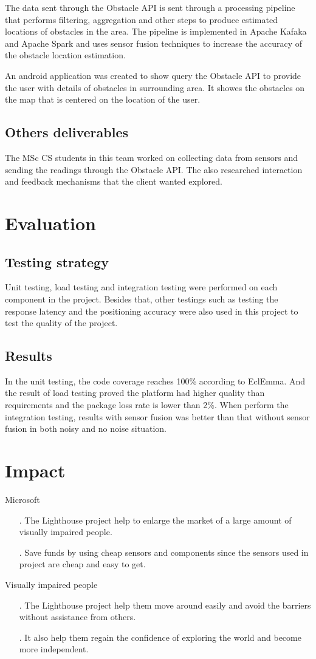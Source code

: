 \documentclass[prodmode,acmtosem]{acmsmall} %
\begin{document}
The data sent through the Obstacle API is sent through a processing pipeline that performs filtering, aggregation and other steps to produce estimated locations of obstacles in the area. The pipeline is implemented in Apache Kafaka and Apache Spark and uses sensor fusion techniques to increase the accuracy of the obstacle location estimation. 

An android application was created to show query the Obstacle API to provide the user with details of obstacles in surrounding area. It showes the obstacles on the map that is centered on the location of the user.

\subsection{Others deliverables}
The MSc CS students in this team worked on collecting data from sensors and sending the readings through the Obstacle API. The also researched interaction and feedback mechanisms that the client wanted explored.

\section{Evaluation}
\subsection{Testing strategy}
Unit testing, load testing and integration testing were performed on each component in the project. Besides that, other testings such as testing the response latency and the positioning accuracy were also used in this project to test the quality of the project.
\subsection{Results}
In the unit testing, the code coverage reaches 100\% according to EclEmma. And the result of load testing proved the platform had higher quality than requirements and the package loss rate is lower than 2\%. When perform the integration testing, results with sensor fusion was better than that without sensor fusion in both noisy and no noise situation.
\section{Impact}
Microsoft
\begin{itemize}
\item[.] The Lighthouse project help to enlarge the market of a large amount of visually impaired people.
\item[.] Save funds by using cheap sensors and components since the sensors used in project are cheap and easy to get.
\end{itemize}
Visually impaired people
\begin{itemize}
\item[.] The Lighthouse project help them move around easily and avoid the barriers without assistance from others.
\item[.] It also help them regain the confidence of exploring the world and become more independent.
\end{itemize}
\end{document}
